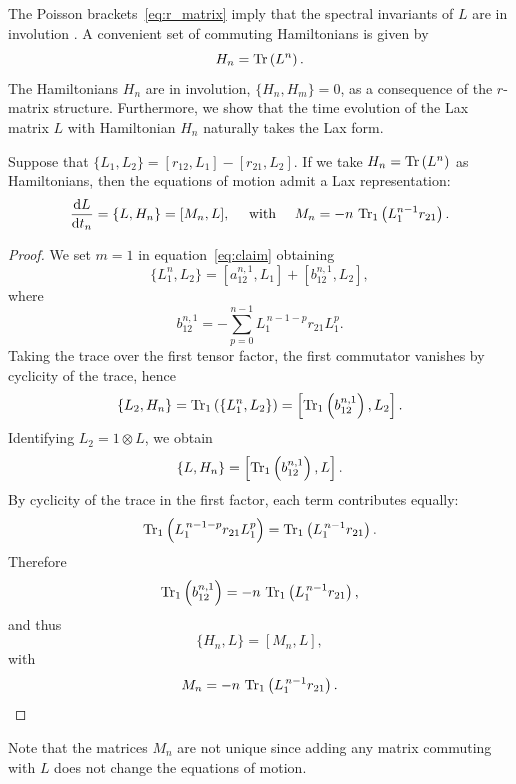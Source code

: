 The Poisson brackets~\eqref{eq:r_matrix} imply that the spectral invariants of $L$ are in involution \cite{babelon2003introduction}. A convenient set of commuting Hamiltonians is given by
\begin{equation}
    H_n = \Tr\left(L^n\right).
\end{equation}
The Hamiltonians $H_n$ are in involution, $\{H_n,H_m\}=0$, as a consequence of the $r$-matrix structure. Furthermore, we show that the time evolution of the Lax matrix $L$ with Hamiltonian $H_n$ naturally takes the Lax form.
\begin{proposition}
    Suppose that $\{L_1,L_2\} = [r_{12},L_1] - [r_{21},L_2]$.
    If we take $H_n = \Tr\left(L^n\right)$ as Hamiltonians, then the
    equations of motion admit a Lax representation:
    \begin{equation}
        \dv{L}{t_n} = \{L,H_n\} = [M_n,L], \quad
        \text{ with } \quad M_n = -n \, \Tr_1 \left( L_1^{n-1} r_{21} \right).
    \end{equation}
\end{proposition}
\begin{proof}
    We set $m = 1$ in equation~\eqref{eq:claim} obtaining
    \begin{equation}
        \{L_1^n,L_2\} = [a_{12}^{n,1},L_1] + [b_{12}^{n,1},L_2],
    \end{equation}
    where
    \begin{equation}
        b_{12}^{n,1} = -\sum_{p=0}^{n-1} L_1^{\,n-1-p} r_{21} L_1^p.
    \end{equation}
    Taking the trace over the first tensor factor, the first commutator vanishes by cyclicity of the trace, hence
    \begin{equation}
        \{L_2,H_n\} = \Tr_1\left(\{L_1^n,L_2\}\right) = \left[\Tr_1\left(b_{12}^{n,1}\right),L_2\right].
    \end{equation}
    Identifying $L_2 = 1 \otimes L$, we obtain
    \begin{equation}
        \{L,H_n\} = \left[\Tr_1\left(b_{12}^{n,1}\right),L\right].
    \end{equation}
    By cyclicity of the trace in the first factor, each term contributes equally:
    \begin{equation}
        \Tr_1\left(L_1^{\,n-1-p} r_{21} L_1^p\right)
        = \Tr_1\left(L_1^{\,n-1} r_{21}\right).
    \end{equation}
    Therefore
    \begin{equation}
        \Tr_1\left(b_{12}^{n,1}\right)
        = -n\,\Tr_1\left(L_1^{\,n-1} r_{21}\right),
    \end{equation}
    and thus
    \begin{equation}
        \{H_n,L\} = [M_n,L],
    \end{equation}
    with
    \begin{equation}
        M_n = -n\,\Tr_1\left(L_1^{\,n-1} r_{21}\right).
    \end{equation}
\end{proof}

\begin{remark}
    Note that the matrices $M_n$ are not unique since adding any matrix commuting with $L$ does not change the equations of motion.
\end{remark}
